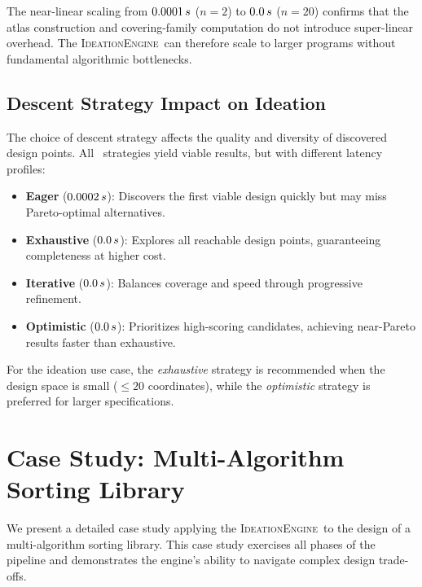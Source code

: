 \documentclass[11pt]{article}
\newcommand{\IdeationEngine}{\textsc{IdeationEngine}}
\begin{document}
The near-linear scaling from $0.0001\,s$ ($n=2$) to
$0.0\,s$ ($n=20$) confirms that the atlas construction
and covering-family computation do not introduce super-linear
overhead.  The \IdeationEngine\ can therefore scale to larger programs
without fundamental algorithmic bottlenecks.

\subsection{Descent Strategy Impact on Ideation}

The choice of descent strategy affects the quality and diversity of
discovered design points.  All \subDescentStrategies\ strategies
yield viable results, but with different latency profiles:

\begin{itemize}[noitemsep]
  \item \textbf{Eager} ($0.0002\,s$): Discovers the first
        viable design quickly but may miss Pareto-optimal alternatives.
  \item \textbf{Exhaustive} ($0.0\,s$): Explores all
        reachable design points, guaranteeing completeness at higher
        cost.
  \item \textbf{Iterative} ($0.0\,s$): Balances
        coverage and speed through progressive refinement.
  \item \textbf{Optimistic} ($0.0\,s$): Prioritizes
        high-scoring candidates, achieving near-Pareto results faster
        than exhaustive.
\end{itemize}

For the ideation use case, the \emph{exhaustive} strategy is recommended
when the design space is small ($\leq 20$ coordinates), while the
\emph{optimistic} strategy is preferred for larger specifications.

\section{Case Study: Multi-Algorithm Sorting Library}\label{sec:case-study}

We present a detailed case study applying the \IdeationEngine\ to
the design of a multi-algorithm sorting library.  This case study
exercises all phases of the pipeline and demonstrates the engine's
ability to navigate complex design trade-offs.
\end{document}
